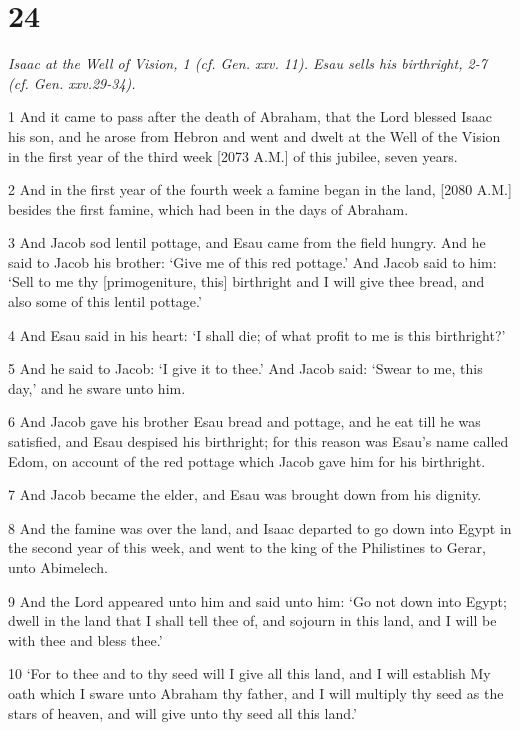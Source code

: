 \chapter{24}

\par \textit{Isaac at the Well of Vision, 1 (cf. Gen. xxv. 11). Esau sells his birthright, 2-7 (cf. Gen. xxv.29-34).}

\par 1 And it came to pass after the death of Abraham, that the Lord blessed Isaac his son, and he arose from Hebron and went and dwelt at the Well of the Vision in the first year of the third week [2073 A.M.] of this jubilee, seven years.
\par 2 And in the first year of the fourth week a famine began in the land, [2080 A.M.] besides the first famine, which had been in the days of Abraham.
\par 3 And Jacob sod lentil pottage, and Esau came from the field hungry. And he said to Jacob his brother: ‘Give me of this red pottage.’ And Jacob said to him: ‘Sell to me thy [primogeniture, this] birthright and I will give thee bread, and also some of this lentil pottage.’
\par 4 And Esau said in his heart: ‘I shall die; of what profit to me is this birthright?’
\par 5 And he said to Jacob: ‘I give it to thee.’ And Jacob said: ‘Swear to me, this day,’ and he sware unto him.
\par 6 And Jacob gave his brother Esau bread and pottage, and he eat till he was satisfied, and Esau despised his birthright; for this reason was Esau's name called Edom, on account of the red pottage which Jacob gave him for his birthright.
\par 7 And Jacob became the elder, and Esau was brought down from his dignity.
\par 8 And the famine was over the land, and Isaac departed to go down into Egypt in the second year of this week, and went to the king of the Philistines to Gerar, unto Abimelech.
\par 9 And the Lord appeared unto him and said unto him: ‘Go not down into Egypt; dwell in the land that I shall tell thee of, and sojourn in this land, and I will be with thee and bless thee.’
\par 10 ‘For to thee and to thy seed will I give all this land, and I will establish My oath which I sware unto Abraham thy father, and I will multiply thy seed as the stars of heaven, and will give unto thy seed all this land.’
